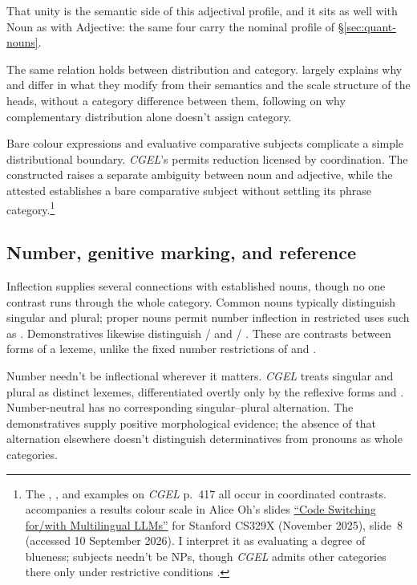 \documentclass[12pt]{article}
\begin{document}
That unity is the semantic side of this adjectival profile, and it sits as well with Noun as with Adjective: the same four carry the nominal profile of §\ref{sec:quant-nouns}.

The same relation holds between distribution and category. \textcite{reynolds2024why} largely explains why  and  differ in what they modify from their semantics and the scale structure of the heads, without a category difference between them, following \textcite[61]{payne2010} on why complementary distribution alone doesn't assign category.

Bare colour expressions and evaluative comparative subjects complicate a simple distributional boundary. \textit{CGEL}'s  permits reduction licensed by coordination. The constructed  raises a separate ambiguity between noun and adjective, while the attested  establishes a bare comparative subject without settling its phrase category.\footnote{The , , and  examples on \textit{CGEL} p.~417 all occur in coordinated contrasts.  accompanies a results colour scale in Alice Oh's slides \href{https://web.stanford.edu/class/cs329x/slides/Lecture12_B_Codeswitching\%20LLMs.pdf}{\enquote{Code Switching for/with Multilingual LLMs}} for Stanford CS329X (November 2025), slide~8 (accessed 10 September 2026). I interpret it as evaluating a degree of blueness; subjects needn't be NPs, though \textit{CGEL} admits other categories there only under restrictive conditions \citep[236]{huddleston2002}.}

\subsection{Number, genitive marking, and reference}\label{sec:inflection}

Inflection supplies several connections with established nouns, though no one contrast runs through the whole category. Common nouns typically distinguish singular and plural; proper nouns permit number inflection in restricted uses such as  \citep[521]{huddleston2002}. Demonstratives likewise distinguish / and / \citep[373]{huddleston2002}. These are contrasts between forms of a lexeme, unlike the fixed number restrictions of  and .

Number needn't be inflectional wherever it matters. \textit{CGEL} treats singular and plural  as distinct lexemes, differentiated overtly only by the reflexive forms  and  \citep[486]{huddleston2002}. Number-neutral  has no corresponding singular--plural alternation. The demonstratives supply positive morphological evidence; the absence of that alternation elsewhere doesn't distinguish determinatives from pronouns as whole categories.
\end{document}

